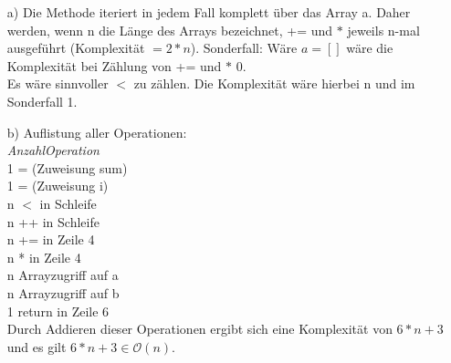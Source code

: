 \documentclass[11pt]{article}
\begin{document}
\begin{itemize}
	\item[a)]
		Die Methode iteriert in jedem Fall komplett über das Array a. Daher werden, wenn n die Länge des Arrays bezeichnet, += und $*$ jeweils n-mal ausgeführt (Komplexität $= 2*n$).
		Sonderfall: Wäre $a = []$ wäre die Komplexität bei Zählung von += und $*$ 0.\\
		Es wäre sinnvoller $<$ zu zählen. Die Komplexität wäre hierbei n und im Sonderfall 1.
	\item[b)]
		Auflistung aller Operationen:\\
		\hspace*{7mm}\textit{Anzahl}\hspace*{8mm}\textit{Operation}\\
		\hspace*{10mm} 1 \hspace*{10mm} = (Zuweisung sum) \\
		\hspace*{10mm} 1 \hspace*{10mm} = (Zuweisung i)\\
		\hspace*{10mm} n \hspace*{10mm} $<$ in Schleife\\
		\hspace*{10mm} n \hspace*{10mm} ++ in Schleife\\
		\hspace*{10mm} n \hspace*{10mm} += in Zeile 4\\
		\hspace*{10mm} n \hspace*{10mm} * in Zeile 4\\
		\hspace*{10mm} n \hspace*{10mm} Arrayzugriff auf a\\
		\hspace*{10mm} n \hspace*{10mm} Arrayzugriff auf b\\
		\hspace*{10mm} 1 \hspace*{10mm} return in Zeile 6\\
		Durch Addieren dieser Operationen ergibt sich eine Komplexität von $6*n+3$ und es gilt $6*n+3 \in \mathcal{O}(n)$.
\end{itemize}
\end{document}
